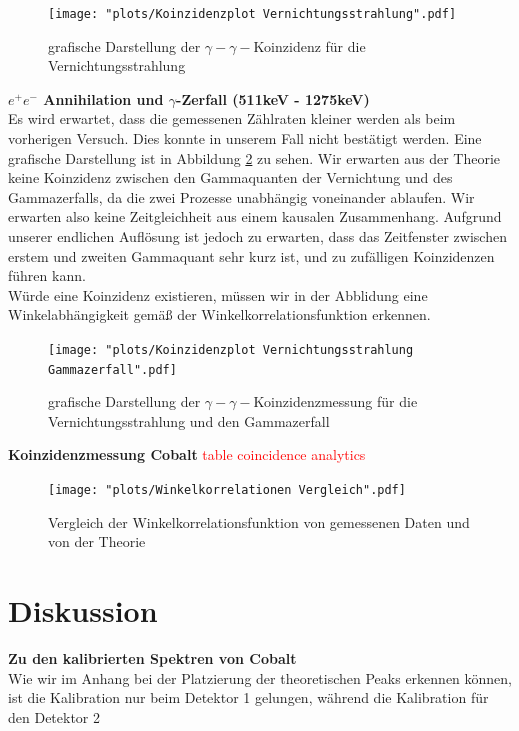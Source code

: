 \documentclass[%
aps,
onecolumn,
11pt,
tightenlines,
nofootinbib,
superscriptaddress,
floatfix,
prd,
]{revtex4-2}
\begin{document}
\begin{figure}[H]
	\centering
	\texttt{[image: "plots/Koinzidenzplot Vernichtungsstrahlung".pdf]}
	\caption{grafische Darstellung der $\gamma - \gamma -$Koinzidenz für die Vernichtungsstrahlung}
	\label{fig:coincidenceannihilation}
\end{figure}

\textbf{$e^+e^- $ Annihilation und $\gamma$-Zerfall (511keV - 1275keV)}\\
Es wird erwartet, dass die gemessenen Zählraten kleiner werden als beim vorherigen Versuch. Dies konnte in unserem Fall nicht bestätigt werden. Eine grafische Darstellung ist in Abbildung \ref{fig:coincidenceannihilgamma} zu sehen. Wir erwarten aus der Theorie keine Koinzidenz zwischen den Gammaquanten der Vernichtung und des Gammazerfalls, da die zwei Prozesse unabhängig voneinander ablaufen. Wir erwarten also keine Zeitgleichheit aus einem kausalen Zusammenhang. Aufgrund unserer endlichen Auflösung ist jedoch zu erwarten, dass das Zeitfenster zwischen erstem und zweiten Gammaquant sehr kurz ist, und zu zufälligen Koinzidenzen führen kann. \\
Würde eine Koinzidenz existieren, müssen wir in der Abblidung eine Winkelabhängigkeit gemäß der Winkelkorrelationsfunktion erkennen.

\begin{figure}[H]
	\centering
	\texttt{[image: "plots/Koinzidenzplot Vernichtungsstrahlung Gammazerfall".pdf]}
	\caption{grafische Darstellung der $\gamma - \gamma -$Koinzidenzmessung für die Vernichtungsstrahlung und den Gammazerfall}
	\label{fig:coincidenceannihilgamma}
\end{figure}

\textbf{Koinzidenzmessung Cobalt}
\textcolor{red}{table coincidence analytics}

\begin{figure}[H]
	\centering
	\texttt{[image: "plots/Winkelkorrelationen Vergleich".pdf]}
	\caption{Vergleich der Winkelkorrelationsfunktion von gemessenen Daten und von der Theorie}
	\label{fig:coincidencecobalt}
\end{figure}




\section{Diskussion}
\label{sec:Diskussion}
\textbf{Zu den kalibrierten Spektren von Cobalt}\\
Wie wir im Anhang bei der Platzierung der theoretischen Peaks erkennen können, ist die Kalibration nur beim Detektor 1 gelungen, während die Kalibration für den Detektor 2  
\end{document}

